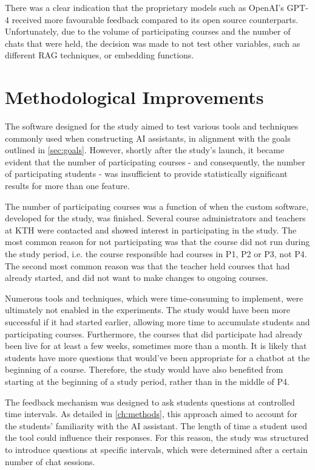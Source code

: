 There was a clear indication that the proprietary models such as OpenAI’s GPT-4 received more favourable feedback compared to its open source counterparts. Unfortunately, due to the volume of participating courses and the number of chats that were held, the decision was made to not test other variables, such as different \gls{RAG} techniques, or embedding functions.


\section{Methodological Improvements}


The software designed for the study aimed to test various tools and techniques commonly used when constructing AI assistants, in alignment with the goals outlined in \ref{sec:goals}. However, shortly after the study's launch, it became evident that the number of participating courses - and consequently, the number of participating students - was insufficient to provide statistically significant results for more than one feature.


The number of participating courses was a function of when the custom software, developed for the study, was finished. Several course administrators and teachers at KTH were contacted and showed interest in participating in the study. The most common reason for not participating was that the course did not run during the study period, i.e. the course responsible had courses in P1, P2 or P3, not P4. The second most common reason was that the teacher held courses that had already started, and did not want to make changes to ongoing courses.


Numerous tools and techniques, which were time-consuming to implement, were ultimately not enabled in the experiments. The study would have been more successful if it had started earlier, allowing more time to accumulate students and participating courses. Furthermore, the courses that did participate had already been live for at least a few weeks, sometimes more than a month. It is likely that students have more questions that would’ve been appropriate for a chatbot at the beginning of a course. Therefore, the study would have also benefited from starting at the beginning of a study period, rather than in the middle of P4.


The feedback mechanism was designed to ask students questions at controlled time intervals. As detailed in \autoref{ch:methods}, this approach aimed to account for the students' familiarity with the AI assistant. The length of time a student used the tool could influence their responses. For this reason, the study was structured to introduce questions at specific intervals, which were determined after a certain number of chat sessions.


